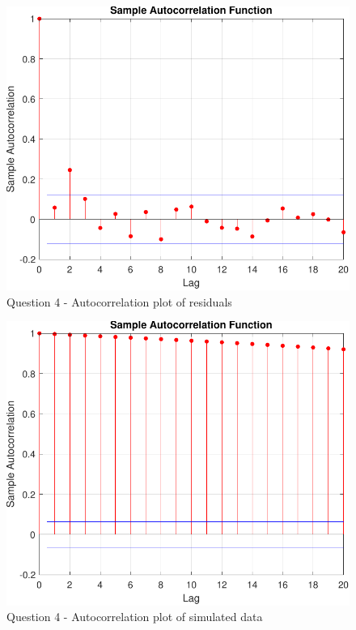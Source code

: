 \documentclass[11pt]{article}
\begin{document}
\begin{enumerate}
\begin{figure}[htp]
\centering
\includegraphics[scale=0.75]{residual-autocorrelation-plot.pdf}
\caption{Question 4 - Autocorrelation plot of residuals}
\label{fig:q4-residual-autocorrplot}
\end{figure}

\begin{figure}[htp]
\centering
\includegraphics[scale=0.75]{data-simulated-autocorrelation-plot.pdf}
\caption{Question 4 - Autocorrelation plot of simulated data}
\label{fig:q4-data-simulated-autocorrplot}
\end{figure}


\end{enumerate}
\end{document}
